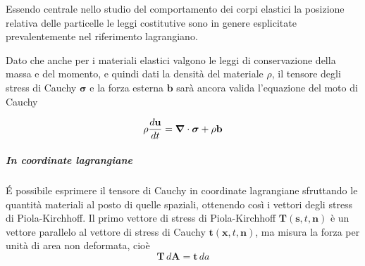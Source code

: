 Essendo centrale nello studio del comportamento dei corpi elastici la posizione relativa delle particelle le leggi costitutive sono in genere esplicitate prevalentemente nel riferimento lagrangiano.

Dato che anche per i materiali elastici valgono le leggi di conservazione della massa e del momento, e quindi dati la densità del materiale $\rho$, il tensore degli stress di Cauchy $\boldsymbol{\sigma}$ e la forza esterna $\mathbf{b}$ sarà ancora valida l'equazione del moto di Cauchy

\begin{equation*}
\rho\frac{d\mathbf{u}}{dt} = \boldsymbol{\nabla}\cdot \boldsymbol{\sigma} + \rho\mathbf{b}
\end{equation*}

%
%

\subparagraph{In coordinate lagrangiane}
\'E possibile esprimere il tensore di Cauchy in coordinate lagrangiane sfruttando le quantità materiali al posto di quelle spaziali, ottenendo così i vettori degli stress di Piola-Kirchhoff.
Il primo vettore di stress di Piola-Kirchhoff $\mathbf{T}(\mathbf{s},t,\mathbf{n})$ è un vettore parallelo al vettore di stress di Cauchy $\mathbf{t}(\mathbf{x},t,\mathbf{n})$, ma misura la forza per unità di area non deformata,
cioè
\begin{equation*}\mathbf{T}\,d\mathbf{A} = \mathbf{t}\,da
\end{equation*}

